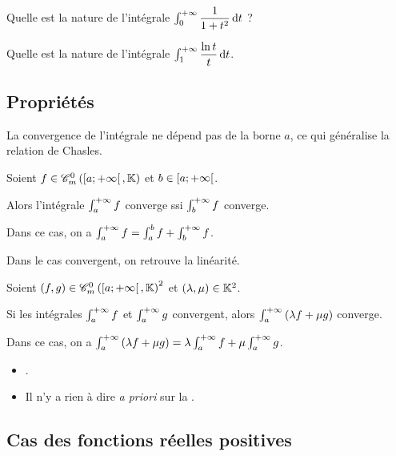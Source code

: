 \begin{exo}
Quelle est la nature de l'intégrale \(\int_0^{\pinf}\dfrac{1}{1+t^2}\odif{t}\) ?
\end{exo}

\begin{exo}
Quelle est la nature de l'intégrale \(\int_1^{\pinf}\dfrac{\ln t}{t}\odif{t}\).
\end{exo}

\subsection{Propriétés}

La convergence de l'intégrale ne dépend pas de la borne \(a\), ce qui généralise la relation de Chasles.

\begin{prop}
Soient \(f\in\contm[\intervie{a}{\pinf}]\) et \(b\in\left[a;+\infty\right[\).

Alors l'intégrale \(\int_a^{+\infty}f\) converge ssi \(\int_b^{+\infty}f\) converge.

Dans ce cas, on a \(\int_a^{+\infty}f=\int_a^bf+\int_b^{+\infty}f\).
\end{prop}

Dans le cas convergent, on retrouve la linéarité.

\begin{prop}
Soient \(\paren{f,g}\in\contm[\intervie{a}{\pinf}]^2\) et \(\left(\lambda,\mu\right)\in\mathbb{K}^2\).

Si les intégrales \(\int_a^{+\infty}f\) et \(\int_a^{+\infty}g\) convergent, alors \(\int_a^{+\infty}\left(\lambda f+\mu g\right)\) converge.

Dans ce cas, on a \(\int_a^{+\infty}\left(\lambda f+\mu g\right)=\lambda\int_a^{+\infty}f+\mu\int_a^{+\infty}g\).
\end{prop}

\begin{rem}
\begin{itemize}
    \item {}. \\
    \item Il n'y a rien à dire \textit{a priori} sur la .
\end{itemize}
\end{rem}

\subsection{Cas des fonctions réelles positives}

